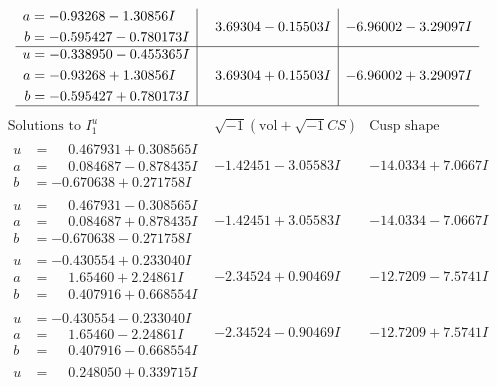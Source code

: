 \documentclass[1p]{elsarticle_modified}
\theoremstyle{definition}
\newcommand{\I}{\sqrt{-1}}
\begin{document}
$$\begin{array}{c|c|c}
\begin{aligned}
a &= -0.93268 - 1.30856 I \\
b &= -0.595427 - 0.780173 I\end{aligned}
 & \phantom{-}3.69304 - 0.15503 I & -6.96002 - 3.29097 I \\ \hline\begin{aligned}
u &= -0.338950 - 0.455365 I \\
a &= -0.93268 + 1.30856 I \\
b &= -0.595427 + 0.780173 I\end{aligned}
 & \phantom{-}3.69304 + 0.15503 I & -6.96002 + 3.29097 I\\
 \hline 
 \end{array}$$\newpage$$\begin{array}{c|c|c}  
\text{Solutions to }I^u_{1}& \I (\text{vol} + \sqrt{-1}CS) & \text{Cusp shape}\\
 \hline 
\begin{aligned}
u &= \phantom{-}0.467931 + 0.308565 I \\
a &= \phantom{-}0.084687 - 0.878435 I \\
b &= -0.670638 + 0.271758 I\end{aligned}
 & -1.42451 - 3.05583 I & -14.0334 + 7.0667 I \\ \hline\begin{aligned}
u &= \phantom{-}0.467931 - 0.308565 I \\
a &= \phantom{-}0.084687 + 0.878435 I \\
b &= -0.670638 - 0.271758 I\end{aligned}
 & -1.42451 + 3.05583 I & -14.0334 - 7.0667 I \\ \hline\begin{aligned}
u &= -0.430554 + 0.233040 I \\
a &= \phantom{-}1.65460 + 2.24861 I \\
b &= \phantom{-}0.407916 + 0.668554 I\end{aligned}
 & -2.34524 + 0.90469 I & -12.7209 - 7.5741 I \\ \hline\begin{aligned}
u &= -0.430554 - 0.233040 I \\
a &= \phantom{-}1.65460 - 2.24861 I \\
b &= \phantom{-}0.407916 - 0.668554 I\end{aligned}
 & -2.34524 - 0.90469 I & -12.7209 + 7.5741 I \\ \hline\begin{aligned}
u &= \phantom{-}0.248050 + 0.339715 I \\

\end{aligned}
\end{array}$$
\end{document}

